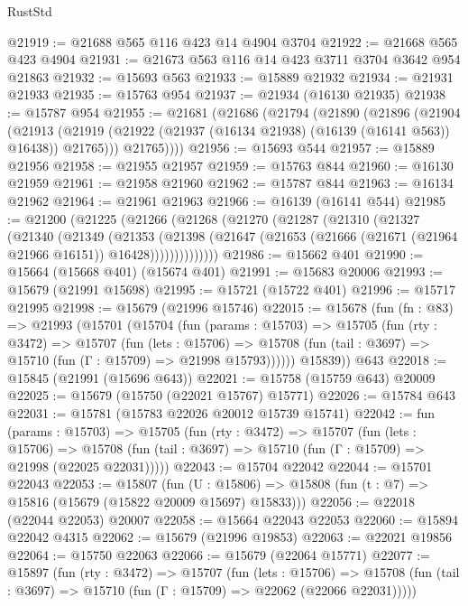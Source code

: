 \begin{lexlean}{RustStd}
\begin{coremodule}
@21919 := @21688 @565 @116 @423 @14 @4904 @3704
@21922 := @21668 @565 @423 @4904
@21931 := @21673 @563 @116 @14 @423 @3711 @3704 @3642 @954 @21863
@21932 := @15693 @563
@21933 := @15889 @21932
@21934 := @21931 @21933
@21935 := @15763 @954
@21937 := @21934 (@16130 @21935)
@21938 := @15787 @954
@21955 := @21681
    (@21686
      (@21794
        (@21890
          (@21896
            (@21904
              (@21913
                (@21919 (@21922 (@21937 (@16134 @21938) (@16139 (@16141 @563)) @16438)) @21765)))
            @21765))))
@21956 := @15693 @544
@21957 := @15889 @21956
@21958 := @21955 @21957
@21959 := @15763 @844
@21960 := @16130 @21959
@21961 := @21958 @21960
@21962 := @15787 @844
@21963 := @16134 @21962
@21964 := @21961 @21963
@21966 := @16139 (@16141 @544)
@21985 := @21200
    (@21225
      (@21266
        (@21268
          (@21270
            (@21287
              (@21310
                (@21327
                  (@21340
                    (@21349
                      (@21353
                        (@21398
                          (@21647
                            (@21653 (@21666 (@21671 (@21964 @21966 @16151)) @16428))))))))))))))
@21986 := @15662 @401
@21990 := @15664 (@15668 @401) (@15674 @401)
@21991 := @15683 @20006
@21993 := @15679 (@21991 @15698)
@21995 := @15721 (@15722 @401)
@21996 := @15717 @21995
@21998 := @15679 (@21996 @15746)
@22015 := @15678
    (fun (fn : @83) =>
    @21993
      (@15701
        (@15704
          (fun (params : @15703) =>
          @15705
            (fun (rty : @3472) =>
            @15707
              (fun (lets : @15706) =>
              @15708 (fun (tail : @3697) => @15710 (fun (Γ : @15709) => @21998 @15793))))))
        @15839))
    @643
@22018 := @15845 (@21991 (@15696 @643))
@22021 := @15758 (@15759 @643) @20009
@22025 := @15679 (@15750 (@22021 @15767) @15771)
@22026 := @15784 @643
@22031 := @15781 (@15783 @22026 @20012 @15739 @15741)
@22042 := fun (params : @15703) =>
  @15705
    (fun (rty : @3472) =>
    @15707
      (fun (lets : @15706) =>
      @15708 (fun (tail : @3697) => @15710 (fun (Γ : @15709) => @21998 (@22025 @22031)))))
@22043 := @15704 @22042
@22044 := @15701 @22043
@22053 := @15807
    (fun (U : @15806) => @15808 (fun (t : @7) => @15816 (@15679 (@15822 @20009 @15697) @15833)))
@22056 := @22018 (@22044 @22053) @20007
@22058 := @15664 @22043 @22053
@22060 := @15894 @22042 @4315
@22062 := @15679 (@21996 @19853)
@22063 := @22021 @19856
@22064 := @15750 @22063
@22066 := @15679 (@22064 @15771)
@22077 := @15897
    (fun (rty : @3472) =>
    @15707
      (fun (lets : @15706) =>
      @15708 (fun (tail : @3697) => @15710 (fun (Γ : @15709) => @22062 (@22066 @22031)))))

\end{coremodule}
\end{lexlean}
